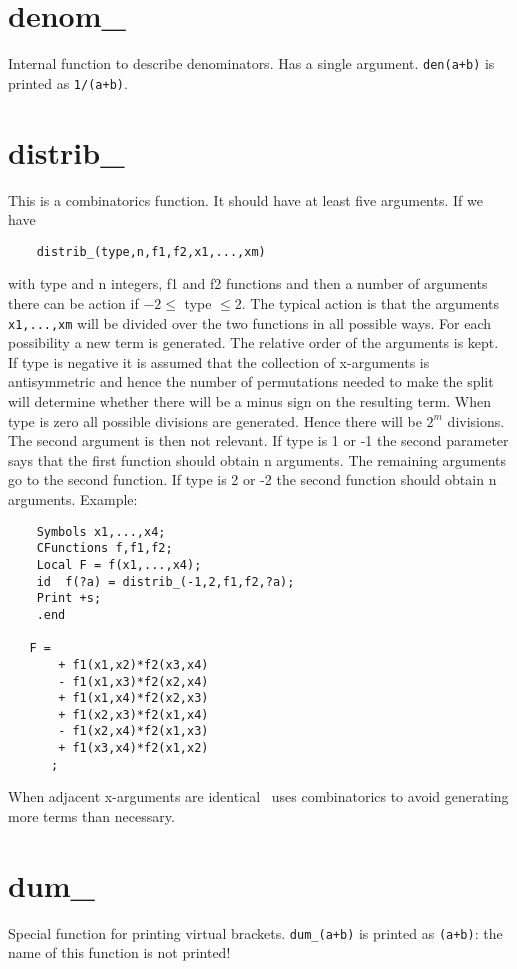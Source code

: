\section{denom\_}
\label{fundenom}
\noindent Internal function to describe denominators. Has a single 
argument. \verb:den(a+b): is printed as \verb:1/(a+b):.

\section{distrib\_}
\label{fundistrib}
\noindent This is a combinatorics function. It should 
have at least five arguments. If we have
\begin{verbatim}
    distrib_(type,n,f1,f2,x1,...,xm)
\end{verbatim}
with type and n integers, f1 and f2 functions and then a number of 
arguments there can be action if $-2 \le$ type $\le 2$. The typical action 
is that the arguments \verb:x1,...,xm: will be divided over the two 
functions in all possible ways. For each possibility a new term is 
generated. The relative order of the arguments is kept. If type is negative 
it is assumed that the collection of x-arguments is 
antisymmetric and hence the number of permutations 
needed to make the split will determine whether there will be a minus sign 
on the resulting term. When type is zero all possible divisions are 
generated. Hence there will be $2^m$ divisions. The second argument is then 
not relevant. If type is 1 or -1 the second parameter says that the first 
function should obtain n arguments. The remaining arguments go to the 
second function. If type is 2 or -2 the second function should obtain n 
arguments. Example:
\begin{verbatim}
    Symbols x1,...,x4;
    CFunctions f,f1,f2;
    Local F = f(x1,...,x4);
    id  f(?a) = distrib_(-1,2,f1,f2,?a);
    Print +s;
    .end

   F =
       + f1(x1,x2)*f2(x3,x4)
       - f1(x1,x3)*f2(x2,x4)
       + f1(x1,x4)*f2(x2,x3)
       + f1(x2,x3)*f2(x1,x4)
       - f1(x2,x4)*f2(x1,x3)
       + f1(x3,x4)*f2(x1,x2)
      ;
\end{verbatim}
When adjacent x-arguments are identical \FORM\ uses combinatorics to avoid 
generating more terms than necessary.


\section{dum\_}
\label{fundum}
\noindent Special function for printing virtual 
brackets. \verb:dum_(a+b): is printed as \verb:(a+b):: the 
name of this function is not printed!

